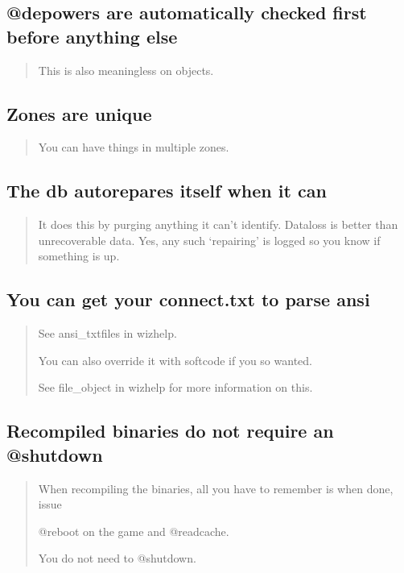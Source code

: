 \documentclass[letterpaper,10pt,english]{sphinxmanual}
\begin{document}
\subsection{@depowers are automatically checked first before anything else}
\label{\detokenize{features:depowers-are-automatically-checked-first-before-anything-else}}\begin{quote}

\sphinxAtStartPar
This is also meaningless on objects.
\end{quote}


\subsection{Zones are unique}
\label{\detokenize{features:zones-are-unique}}\begin{quote}

\sphinxAtStartPar
You can have things in multiple zones.
\end{quote}


\subsection{The db auto\sphinxhyphen{}repares itself when it can}
\label{\detokenize{features:the-db-auto-repares-itself-when-it-can}}\begin{quote}

\sphinxAtStartPar
It does this by purging anything
it can’t identify.  Dataloss is better than unrecoverable data.
Yes, any such ‘repairing’ is logged so you know if something is up.
\end{quote}


\subsection{You can get your connect.txt to parse ansi}
\label{\detokenize{features:you-can-get-your-connect-txt-to-parse-ansi}}\begin{quote}

\sphinxAtStartPar
See ansi\_txtfiles in wizhelp.

\sphinxAtStartPar
You can also override it with softcode if you so wanted.

\sphinxAtStartPar
See file\_object in wizhelp for more information on this.
\end{quote}


\subsection{Re\sphinxhyphen{}compiled binaries do not require an @shutdown}
\label{\detokenize{features:re-compiled-binaries-do-not-require-an-shutdown}}\begin{quote}

\sphinxAtStartPar
When re\sphinxhyphen{}compiling the binaries, all you have to remember is when done, issue

\sphinxAtStartPar
@reboot on the game and @readcache.

\sphinxAtStartPar
You do not need to @shutdown.
\end{quote}
\end{document}
